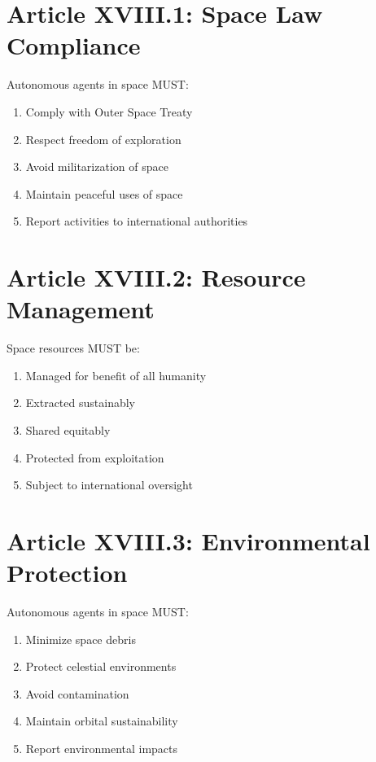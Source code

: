 \section{Article XVIII.1: Space Law Compliance}

\begin{articlebox}
Autonomous agents in space MUST:
\begin{enumerate}
    \item Comply with Outer Space Treaty
    \item Respect freedom of exploration
    \item Avoid militarization of space
    \item Maintain peaceful uses of space
    \item Report activities to international authorities
\end{enumerate}
\end{articlebox}

\vspace{0.5cm}

\section{Article XVIII.2: Resource Management}

\begin{articlebox}
Space resources MUST be:
\begin{enumerate}
    \item Managed for benefit of all humanity
    \item Extracted sustainably
    \item Shared equitably
    \item Protected from exploitation
    \item Subject to international oversight
\end{enumerate}
\end{articlebox}

\vspace{0.5cm}

\section{Article XVIII.3: Environmental Protection}

\begin{articlebox}
Autonomous agents in space MUST:
\begin{enumerate}
    \item Minimize space debris
    \item Protect celestial environments
    \item Avoid contamination
    \item Maintain orbital sustainability
    \item Report environmental impacts
\end{enumerate}
\end{articlebox}

